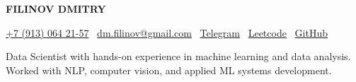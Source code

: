 \begin{center}
  {\huge\rmfamily\bfseries FILINOV DMITRY}
\end{center}
\begin{center}
\href{tel:+79130642157}{+7 (913) 064 21-57} \textbar\ 
\href{mailto:dm.filinov@gmail.com}{dm.filinov@gmail.com} \textbar\
  \href{https://t.me/D1ffic00lt}{Telegram} \textbar\ 
  \href{https://leetcode.com/u/D1ffic00lt/}{Leetcode} \textbar\ 
  \href{https://github.com/D1ffic00lt}{GitHub}
\end{center}
{\centering\fontsize{11pt}{13pt}\selectfont Data Scientist with hands-on experience in machine learning and data analysis.\\ Worked with NLP, computer vision, and applied ML systems development.\par}
